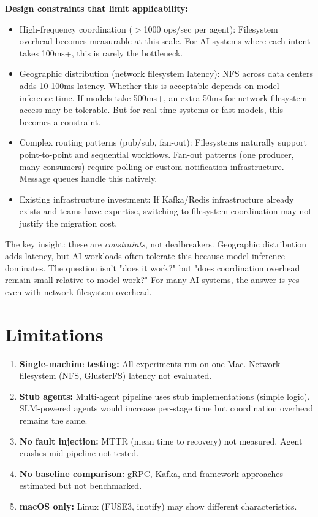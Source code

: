 \documentclass[11pt]{article}
\begin{document}
\textbf{Design constraints that limit applicability:}
\begin{itemize}
\item High-frequency coordination ($>$1000 ops/sec per agent): Filesystem overhead becomes measurable at this scale. For AI systems where each intent takes 100ms+, this is rarely the bottleneck.
\item Geographic distribution (network filesystem latency): NFS across data centers adds 10-100ms latency. Whether this is acceptable depends on model inference time. If models take 500ms+, an extra 50ms for network filesystem access may be tolerable. But for real-time systems or fast models, this becomes a constraint.
\item Complex routing patterns (pub/sub, fan-out): Filesystems naturally support point-to-point and sequential workflows. Fan-out patterns (one producer, many consumers) require polling or custom notification infrastructure. Message queues handle this natively.
\item Existing infrastructure investment: If Kafka/Redis infrastructure already exists and teams have expertise, switching to filesystem coordination may not justify the migration cost.
\end{itemize}

The key insight: these are \textit{constraints}, not dealbreakers. Geographic distribution adds latency, but AI workloads often tolerate this because model inference dominates. The question isn't "does it work?" but "does coordination overhead remain small relative to model work?" For many AI systems, the answer is yes even with network filesystem overhead.

\section{Limitations}

\begin{enumerate}
\item \textbf{Single-machine testing:} All experiments run on one Mac. Network filesystem (NFS, GlusterFS) latency not evaluated.
\item \textbf{Stub agents:} Multi-agent pipeline uses stub implementations (simple logic). SLM-powered agents would increase per-stage time but coordination overhead remains the same.
\item \textbf{No fault injection:} MTTR (mean time to recovery) not measured. Agent crashes mid-pipeline not tested.
\item \textbf{No baseline comparison:} gRPC, Kafka, and framework approaches estimated but not benchmarked.
\item \textbf{macOS only:} Linux (FUSE3, inotify) may show different characteristics.
\end{enumerate}
\end{document}
